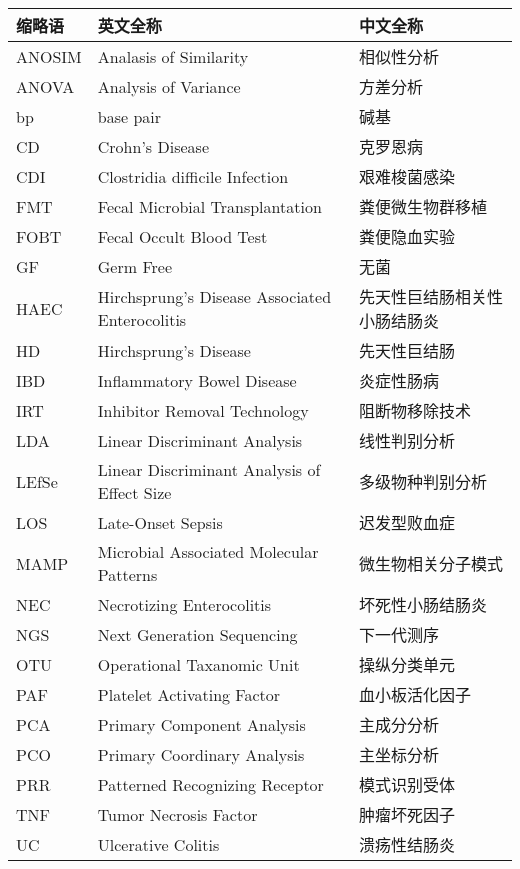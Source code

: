 \begin{nomenclaturename}
\label{chap:symb}

\begin{table}[htbp]
  \centering
 \begin{tabular}{llp{4cm}}
  \toprule
  缩略语 & 英文全称 & 中文全称 \\
  \midrule
    ANOSIM & Analasis of Similarity & 相似性分析\\
    ANOVA & Analysis of Variance & 方差分析\\
    bp & base pair & 碱基\\
    CD & Crohn’s Disease & 克罗恩病\\
    CDI &	Clostridia difficile Infection & 艰难梭菌感染\\
    FMT & Fecal Microbial Transplantation & 粪便微生物群移植\\
    FOBT & Fecal Occult Blood Test & 粪便隐血实验\\
    GF & Germ Free & 无菌\\
    HAEC & Hirchsprung’s Disease Associated Enterocolitis & 先天性巨结肠相关性小肠结肠炎\\
    HD & Hirchsprung’s Disease & 先天性巨结肠\\
    IBD & Inflammatory Bowel Disease & 炎症性肠病\\
    IRT & Inhibitor Removal Technology & 阻断物移除技术\\
    LDA & Linear Discriminant Analysis & 线性判别分析\\
    LEfSe & Linear Discriminant Analysis of Effect Size & 多级物种判别分析\\
    LOS & Late-Onset Sepsis & 迟发型败血症\\
    MAMP & Microbial Associated Molecular Patterns & 微生物相关分子模式\\
    NEC & Necrotizing Enterocolitis & 坏死性小肠结肠炎\\
    NGS & Next Generation Sequencing & 下一代测序\\
    OTU & Operational Taxanomic Unit & 操纵分类单元\\
    PAF & Platelet Activating Factor & 血小板活化因子\\
    PCA & Primary Component Analysis & 主成分分析\\
    PCO & Primary Coordinary Analysis & 主坐标分析\\
    PRR & Patterned Recognizing Receptor & 模式识别受体\\
    TNF & Tumor Necrosis Factor & 肿瘤坏死因子\\
    UC & Ulcerative Colitis & 溃疡性结肠炎 \\
  \bottomrule
 \end{tabular}
\end{table}

\end{nomenclaturename}
